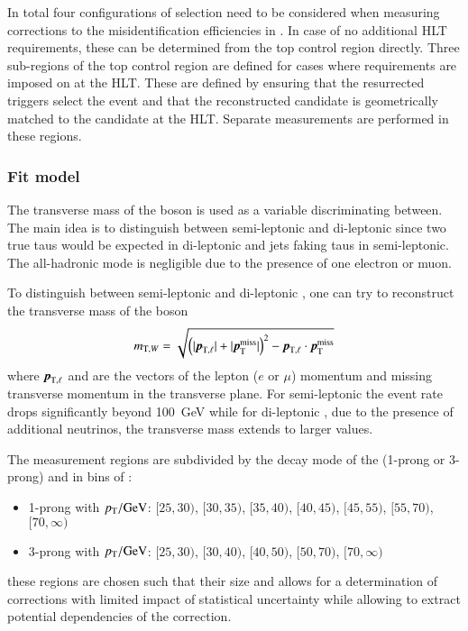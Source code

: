 In total four configurations of \tauhadvis selection need to be
considered when measuring corrections to the \tauhadvis
misidentification efficiencies in \ttbar. In case of no additional HLT
requirements, these can be determined from the top control region
directly. Three sub-regions of the top control region are defined for
cases where requirements are imposed on \tauhadvis at the HLT. These
are defined by ensuring that the resurrected triggers select the event
and that the reconstructed \tauhadvis candidate is geometrically
matched to the \tauhadvis candidate at the HLT. Separate measurements
are performed in these regions.



\subsubsection{Fit model}

The transverse mass of the \PW boson is used as a variable
discriminating between. The main idea is to distinguish between
semi-leptonic and di-leptonic \ttbar since two true taus would be
expected in di-leptonic and jets faking taus in semi-leptonic. The
all-hadronic mode is negligible due to the presence of one electron or
muon.

To distinguish between semi-leptonic and di-leptonic \ttbar, one can
try to reconstruct the transverse mass of the \PW boson
\begin{align*}
  \mTW = \sqrt{\left( | \myvec{p}_{\text{T}, \ell} | + | \pTmiss | \right)^2
               - \myvec{p}_{\text{T}, \ell} \cdot \pTmiss}
\end{align*}
where $\myvec{p}_{\text{T}, \ell}$ and \pTmiss are the vectors of the
lepton ($e$ or $\mu$) momentum and missing transverse momentum in the
transverse plane. For semi-leptonic \ttbar the event rate drops
significantly beyond \SI{100}{\GeV} while for di-leptonic \ttbar, due
to the presence of additional neutrinos, the transverse mass extends
to larger values.



The measurement regions are subdivided by the decay mode of the
\tauhadvis (1-prong or 3-prong) and in bins of \tauhadvis \pT:
\begin{itemize}
\item 1-prong \tauhadvis with $\pT / \si{\GeV}$: $[25, 30)$, $[30, 35)$,
  $[35, 40)$, $[40, 45)$, $[45, 55)$, $[55, 70)$, $[70, \infty)$

\item 3-prong \tauhadvis with $\pT / \si{\GeV}$: $[25, 30)$, $[30, 40)$,
  $[40, 50)$, $[50, 70)$, $[70, \infty)$
\end{itemize}
these regions are chosen such that their size and allows for a
determination of corrections with limited impact of statistical
uncertainty while allowing to extract potential \pT dependencies of
the correction.

